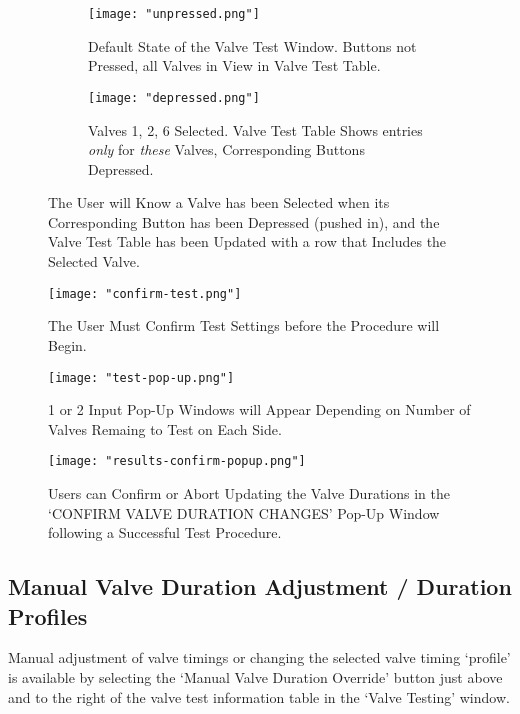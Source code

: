 \documentclass{article}
\begin{document}
\begin{figure}[h!]
    \centering
    \begin{subfigure}[t]{.45\textwidth}
        \centering
        \texttt{[image: "unpressed.png"]}
        \caption{Default State of the Valve Test Window. Buttons not Pressed, all Valves in View in Valve Test Table.}
        \label{fig:unpressed}
    \end{subfigure}
    \hfill
    \begin{subfigure}[t]{.45\textwidth}
        \centering
        \texttt{[image: "depressed.png"]}
        \caption{Valves 1, 2, 6 Selected. Valve Test Table Shows entries \textit{only} for \textit{these} Valves, Corresponding Buttons 
        Depressed.}
        \label{fig:depressed}
    \end{subfigure}
    \caption{The User will Know a Valve has been Selected when its Corresponding Button has been Depressed (pushed in), and the Valve
    Test Table has been Updated with a row that Includes the Selected Valve.}
    \label{fig:test-buttons}
\end{figure}

\begin{figure}[h!]
        \centering
        \texttt{[image: "confirm-test.png"]}
        \caption{The User Must Confirm Test Settings before the Procedure will Begin.}
        \label{fig:confirm-test}
\end{figure}

\begin{figure}[h!]
        \centering
        \texttt{[image: "test-pop-up.png"]}
        \caption{1 or 2 Input Pop-Up Windows will Appear Depending on Number of Valves Remaing to Test on Each Side.}
        \label{fig:test-pop-up}
\end{figure}

\begin{figure}[h!]
        \centering
        \texttt{[image: "results-confirm-popup.png"]}
        \caption{Users can Confirm or Abort Updating the Valve Durations in the `CONFIRM VALVE DURATION CHANGES' Pop-Up Window following a
        Successful Test Procedure.}
        \label{fig:results-confirm-popup}
\end{figure}

\FloatBarrier

\subsection{Manual Valve Duration Adjustment / Duration Profiles}
Manual adjustment of valve timings or changing the selected valve timing `profile' is available by selecting the `Manual Valve Duration 
Override' button just above and to the right of the valve test information table in the `Valve Testing' window. 
\end{document}
